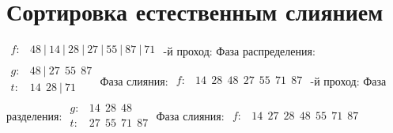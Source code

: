 \documentclass{article}
\begin{document}
\section*{Сортировка естественным слиянием}
$\begin{array}{rl}
        f: & 48 ~|~ 14 ~|~ 28 ~|~ 27 ~|~ 55 ~|~ 87 ~|~ 71 \\
    \end{array}$ -й проход: \newline
\indent Фаза распределения:
$\begin{array}{rl}
        g: & 48 ~|~ 27 ~~ 55 ~~ 87 \\
        t: & 14 ~~ 28 ~|~ 71       \\
    \end{array}$ \newline
\indent Фаза слияния:
$\begin{array}{lr}
        f: & 14 ~~ 28 ~~ 48 ~~ 27 ~~ 55 ~~ 71 ~~ 87 \\
    \end{array}$ -й проход: \newline
\indent Фаза разделения:
$\begin{array}{rl}
        g: & 14 ~~ 28 ~~ 48       \\
        t: & 27 ~~ 55 ~~ 71 ~~ 87 \\
    \end{array}$ \newline
\indent Фаза слияния:
$\begin{array}{lr}
        f: & 14 ~~ 27 ~~ 28 ~~ 48 ~~ 55 ~~ 71 ~~ 87 \\
    \end{array}$ \newline
\end{document}
